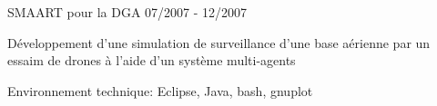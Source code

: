 \begin{cventries}
  \cventry
    {SMAART pour la DGA}
    {}
    {}
    {07/2007 - 12/2007}
    {
      \begin{cvitems}
        \item {Développement d'une simulation de surveillance d’une base
            aérienne par un essaim de drones à l’aide d’un système
            multi-agents}
        \item {Environnement technique: Eclipse, Java, bash, gnuplot}
      \end{cvitems}
    }

\end{cventries}
